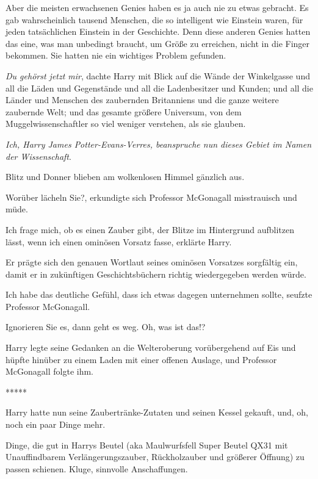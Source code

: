 Aber die meisten erwachsenen Genies haben es ja auch nie zu etwas gebracht. Es
gab wahrscheinlich tausend Menschen, die so intelligent wie Einstein waren, für
jeden tatsächlichen Einstein in der Geschichte. Denn diese anderen Genies hatten
das eine, was man unbedingt braucht, um Größe zu erreichen, nicht in die Finger
bekommen. Sie hatten nie ein wichtiges Problem gefunden.

\emph{Du gehörst jetzt mir}, dachte Harry mit Blick auf die Wände der
Winkelgasse und all die Läden und Gegenstände und all die Ladenbesitzer und
Kunden; und all die Länder und Menschen des zaubernden Britanniens und die ganze
weitere zaubernde Welt; und das gesamte größere Universum, von dem
Muggelwissenschaftler so viel weniger verstehen, als sie glauben.

\emph{Ich, Harry James Potter-Evans-Verres, beanspruche nun dieses Gebiet im
Namen der Wissenschaft}.

Blitz und Donner blieben am wolkenlosen Himmel gänzlich aus.

\glqq{}Worüber lächeln Sie?\grqq{}, erkundigte sich Professor McGonagall
misstrauisch und müde.

\glqq{}Ich frage mich, ob es einen Zauber gibt, der Blitze im Hintergrund
aufblitzen lässt, wenn ich einen ominösen Vorsatz fasse\grqq{}, erklärte Harry.

Er prägte sich den genauen Wortlaut seines ominösen Vorsatzes sorgfältig ein,
damit er in zukünftigen Geschichtsbüchern richtig wiedergegeben werden würde.

\glqq{}Ich habe das deutliche Gefühl, dass ich etwas dagegen unternehmen
sollte\grqq{}, seufzte Professor McGonagall.

\glqq{}Ignorieren Sie es, dann geht es weg. Oh, was ist das!?\grqq{}

Harry legte seine Gedanken an die Welteroberung vorübergehend auf Eis und hüpfte
hinüber zu einem Laden mit einer offenen Auslage, und Professor McGonagall
folgte ihm.

\begin{center}*****\end{center}

Harry hatte nun seine Zaubertränke-Zutaten und seinen Kessel gekauft, und, oh,
noch ein paar Dinge mehr.

Dinge, die gut in Harrys Beutel (aka Maulwurfsfell Super Beutel QX31 mit
Unauffindbarem Verlängerungszauber, Rückholzauber und größerer Öffnung) zu
passen schienen. Kluge, sinnvolle Anschaffungen.

